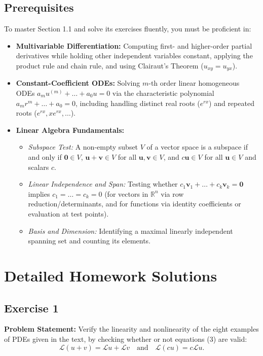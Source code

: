 \documentclass[11pt,a4paper]{article}
\begin{document}
\subsection{Prerequisites}
To master Section 1.1 and solve its exercises fluently, you must be proficient in:
\begin{itemize}
    \item \textbf{Multivariable Differentiation:} Computing first- and higher-order partial derivatives while holding other independent variables constant, applying the product rule and chain rule, and using Clairaut's Theorem ($u_{xy} = u_{yx}$).
    \item \textbf{Constant-Coefficient ODEs:} Solving $m$-th order linear homogeneous ODEs $a_m u^{(m)} + \dots + a_0 u = 0$ via the characteristic polynomial $a_m r^m + \dots + a_0 = 0$, including handling distinct real roots ($e^{rx}$) and repeated roots ($e^{rx}, x e^{rx}, \dots$).
    \item \textbf{Linear Algebra Fundamentals:}
    \begin{itemize}
        \item \emph{Subspace Test:} A non-empty subset $V$ of a vector space is a subspace if and only if $\mathbf{0} \in V$, $\mathbf{u} + \mathbf{v} \in V$ for all $\mathbf{u}, \mathbf{v} \in V$, and $c\mathbf{u} \in V$ for all $\mathbf{u} \in V$ and scalars $c$.
        \item \emph{Linear Independence and Span:} Testing whether $c_1 \mathbf{v}_1 + \dots + c_k \mathbf{v}_k = \mathbf{0}$ implies $c_1 = \dots = c_k = 0$ (for vectors in $\mathbb{R}^n$ via row reduction/determinants, and for functions via identity coefficients or evaluation at test points).
        \item \emph{Basis and Dimension:} Identifying a maximal linearly independent spanning set and counting its elements.
    \end{itemize}
\end{itemize}

\newpage
\section{Detailed Homework Solutions}

\subsection*{Exercise 1}
\textbf{Problem Statement:} Verify the linearity and nonlinearity of the eight examples of PDEs given in the text, by checking whether or not equations (3) are valid:
\[
    \mathcal{L}(u + v) = \mathcal{L}u + \mathcal{L}v \quad \text{and} \quad \mathcal{L}(cu) = c\mathcal{L}u.
\]
\end{document}
